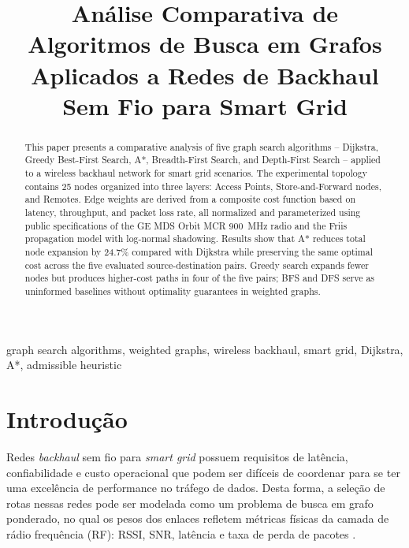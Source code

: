 \documentclass[conference]{IEEEtran}
\begin{document}
\title{Análise Comparativa de Algoritmos de Busca em Grafos Aplicados a
       Redes de Backhaul Sem Fio para Smart Grid}

\author{
}

\maketitle

\begin{abstract}
This paper presents a comparative analysis of five graph search algorithms
-- Dijkstra, Greedy Best-First Search, A*, Breadth-First Search, and Depth-First
Search -- applied to a wireless backhaul network for smart grid scenarios. 
The experimental topology contains 25 nodes organized into three layers: 
Access Points, Store-and-Forward nodes, and Remotes. Edge weights are derived 
from a composite cost function based on latency, throughput, and packet loss rate,
all normalized and parameterized using public specifications of the GE MDS 
Orbit MCR 900~MHz radio and the Friis propagation model with log-normal shadowing. 
Results show that A* reduces total node expansion by 24.7\% compared with 
Dijkstra while preserving the same optimal cost across the five evaluated 
source-destination pairs. Greedy search expands fewer nodes but produces 
higher-cost paths in four of the five pairs; BFS and DFS serve as uninformed 
baselines without optimality guarantees in weighted graphs.
\end{abstract}

\begin{IEEEkeywords}
graph search algorithms, weighted graphs, wireless backhaul, smart grid,
Dijkstra, A*, admissible heuristic
\end{IEEEkeywords}

\section{Introdução}

Redes \textit{backhaul} sem fio para \textit{smart grid} possuem requisitos 
de latência, confiabilidade e custo operacional que podem ser difíceis de 
coordenar para se ter uma excelência de performance no tráfego de dados. Desta
forma, a seleção de rotas nessas redes pode ser modelada como um problema de 
busca em grafo ponderado, no qual os pesos dos enlaces refletem métricas físicas da 
camada de rádio frequência (RF): RSSI, SNR, latência e taxa de perda de pacotes
\cite{rappaport2002}.
\end{document}
